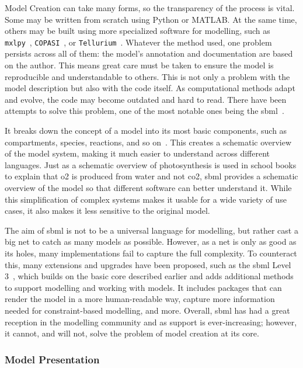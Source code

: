 Model Creation can take many forms, so the transparency of the process is vital. Some may be written from scratch using Python or MATLAB. At the same time, others may be built using more specialized software for modelling, such as \verb|mxlpy|~\cite{vanaalstMxlPyPythonPackage2025}, \verb|COPASI|~\cite{hoopsCOPASICOmplexPAthway2006}, or \verb|Tellurium|~\cite{choiTelluriumExtensiblePythonbased2018}. Whatever the method used, one problem persists across all of them: the model's annotation and documentation are based on the author. This means great care must be taken to ensure the model is reproducible and understandable to others. This is not only a problem with the model description but also with the code itself. As computational methods adapt and evolve, the code may become outdated and hard to read. There have been attempts to solve this problem, one of the most notable ones being the \gls{sbml}~\cite{huckaSystemsBiologyMarkup2003}. 

It breaks down the concept of a model into its most basic components, such as compartments, species, reactions, and so on~\cite{huckaSystemsBiologyMarkup2003}. This creates a schematic overview of the model system, making it much easier to understand across different languages. Just as a schematic overview of photosynthesis is used in school books to explain that \gls{o2} is produced from water and not \gls{co2}, \gls{sbml} provides a schematic overview of the model so that different software can better understand it. While this simplification of complex systems makes it usable for a wide variety of use cases, it also makes it less sensitive to the original model.

The aim of \gls{sbml} is not to be a universal language for modelling, but rather cast a big net to catch as many models as possible. However, as a net is only as good as its holes, many implementations fail to capture the full complexity. To counteract this, many extensions and upgrades have been proposed, such as the \gls{sbml} Level 3~\cite{keatingSBMLLevel32020a}, which builds on the basic core described earlier and adds additional methods to support modelling and working with models. It includes packages that can render the model in a more human-readable way, capture more information needed for constraint-based modelling, and more. Overall, \gls{sbml} has had a great reception in the modelling community and as support is ever-increasing; however, it cannot, and will not, solve the problem of model creation at its core.

\subsubsection{Model Presentation}\label{sec:intro-model-presentation}

